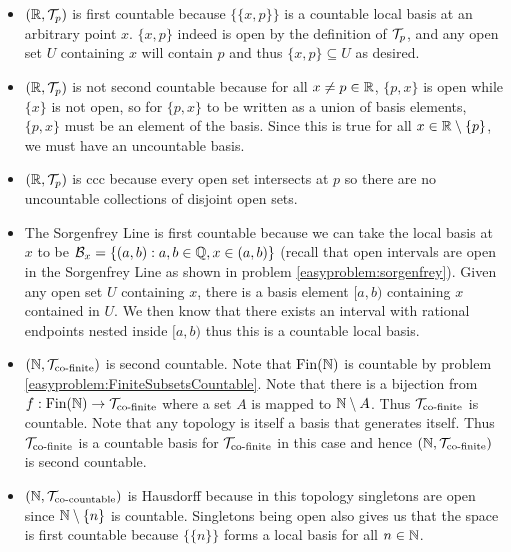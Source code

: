 \documentclass{article}
\begin{document}
{\begin{itemize}
        \item $(\mathbb{R}, \mathcal{T}_{p})$ is first countable because $\{\{x, p\}\}$ is a countable local basis at an arbitrary point $x$. $\{x,p\}$ indeed is open by the definition of $\mathcal{T}_{p}$, and any open set $U$ containing $x$ will contain $p$ and thus $\{x,p\}\subseteq U$ as desired.
        \item $(\mathbb{R}, \mathcal{T}_{p})$ is not second countable because for all $x\neq p\in \mathbb{R}$, $\{p,x\}$ is open while $\{x\}$ is not open, so for $\{p,x\}$ to be written as a union of basis elements, $\{p, x\}$ must be an element of the basis. Since this is true for all $x\in \mathbb{R}\setminus\{p\}$, we must have an uncountable basis.
        \item $(\mathbb{R}, \mathcal{T}_{p})$ is ccc because every open set intersects at $p$ so there are no uncountable collections of disjoint open sets.
        \item The Sorgenfrey Line is first countable because we can take the local basis at $x$ to be $\mathcal{B}_{x} = \{(a,b): a,b\in \mathbb{Q}, x\in (a,b)\}$ (recall that open intervals are open in the Sorgenfrey Line as shown in problem \ref{easyproblem:sorgenfrey}). Given any open set $U$ containing $x$, there is a basis element $[a,b)$ containing $x$ contained in $U$. We then know that there exists an interval with rational endpoints nested inside $[a,b)$ thus this is a countable local basis.
        \item $(\mathbb{N}, \mathcal{T}_{\text{co-finite}})$ is second countable. Note that $\text{Fin}(\mathbb{N})$ is countable by problem \ref{easyproblem:FiniteSubsetsCountable}. Note that there is a bijection from $f: \text{Fin}(\mathbb{N})\to \mathcal{T}_{\text{co-finite}}$ where a set $A$ is mapped to $\mathbb{N}\setminus A$. Thus $\mathcal{T}_{\text{co-finite}}$ is countable. Note that any topology is itself a basis that generates itself. Thus $\mathcal{T}_{\text{co-finite}}$ is a countable basis for $\mathcal{T}_{\text{co-finite}}$ in this case and hence $(\mathbb{N}, \mathcal{T}_{\text{co-finite}})$ is second countable.
        \item $(\mathbb{N}, \mathcal{T}_{\text{co-countable}})$ is Hausdorff because in this topology singletons are open since $\mathbb{N}\setminus\{n\}$ is countable. Singletons being open also gives us that the space is first countable because $\{\{n\}\}$ forms a local basis for all $n\in \mathbb{N}$.
    \end{itemize}
}
\end{document}
